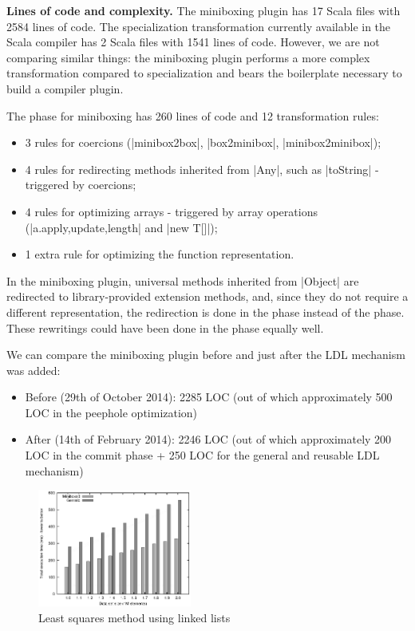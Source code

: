 \textbf{Lines of code and complexity.} The miniboxing plugin has 17 Scala files with 2584 lines of code. The specialization transformation currently available in the Scala compiler \cite{iuli-thesis} has 2 Scala files with 1541 lines of code. However, we are not comparing similar things: the miniboxing plugin performs a more complex transformation compared to specialization and bears the boilerplate necessary to build a compiler plugin.

The \commit{} phase for miniboxing has 260 lines of code and 12 transformation rules:
\begin{itemize}
\item 3 rules for coercions (|minibox2box|, |box2minibox|, |minibox2minibox|);
\item 4 rules for redirecting methods inherited from |Any|, such as |toString| - triggered by coercions;
\item 4 rules for optimizing arrays - triggered by array operations (|a.{apply,update,length}| and |new T[]|);
\item 1 extra rule for optimizing the function representation.
\end{itemize}

In the miniboxing plugin, universal methods inherited from |Object| are redirected to library-provided extension methods, and, since they do not require a different representation, the redirection is done in the \commit{} phase instead of the \coerce{} phase. These rewritings could have been done in the \coerce{} phase equally well.

We can compare the miniboxing plugin before and just after the LDL mechanism was added:
\begin{itemize}
\item Before (29th of October 2014): 2285 LOC (out of which approximately 500 LOC in the peephole optimization)
\item After (14th of February 2014): 2246 LOC (out of which approximately 200 LOC in the commit phase + 250 LOC for the general and reusable LDL mechanism)
\end{itemize}


\begin{figure}
\centering
\includegraphics[width=0.45\textwidth]{graph.eps}
\caption{Least squares method using linked lists}
\label{fig:linkedlist}
\vspace{-1.0em}
\end{figure}

